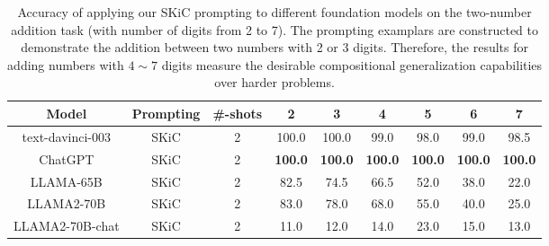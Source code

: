 \documentclass{article} %
\begin{document}
\begin{table}[ht]
\caption{Accuracy of applying our SKiC prompting to different foundation models on the two-number addition task (with number of digits from 2 to 7). The prompting examplars are constructed to demonstrate the addition between two numbers with 2 or 3 digits. Therefore, the results for adding numbers with $4 \sim 7$ digits measure the desirable compositional generalization capabilities over harder problems.} \label{Tab:add_results_llama2}
\centering
\begin{tabular}{c|c|c|cc|cccc} \toprule
\textbf{Model}             & \textbf{Prompting} &\textbf{\#-shots} & \multicolumn{1}{c}{\textbf{2}} & \multicolumn{1}{c|}{\textbf{3}} & \textbf{4}   & \textbf{5}   & \textbf{6}   & \textbf{7}   \\ \midrule \midrule

\multirow{1}{*}{text-davinci-003}  
                           & SKiC  &2   & 100.0                   & 100.0                   & 99.0  & 98.0  & 99.0  & 98.5  \\  
\multirow{1}{*}{ChatGPT} 
                           & SKiC &2      & \textbf{100.0}                   & \textbf{100.0}                   & \textbf{100.0} & \textbf{100.0} & \textbf{100.0} & \textbf{100.0} \\ \midrule
\multirow{1}{*}{LLAMA-65B} 
                           & SKiC  &2     & 82.5                    & 74.5                    & 66.5  & 52.0  &38.0  & 22.0  \\  
\multirow{1}{*}{LLAMA2-70B} 
                           & SKiC  &2     & 83.0                    &78.0                    & 68.0  &55.0  & 40.0  & 25.0  \\ 

\multirow{1}{*}{LLAMA2-70B-chat} 
                           & SKiC  &2     & 11.0                    & 12.0                 & 14.0  & 23.0  & 15.0  & 13.0  \\ \bottomrule
\end{tabular} 
\end{table}
\end{document}

